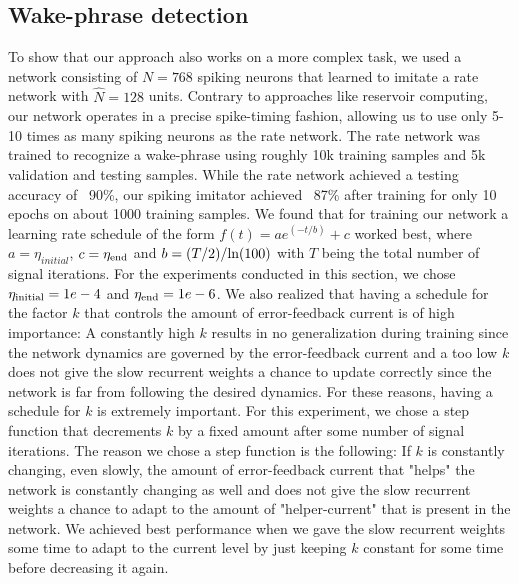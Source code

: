 \documentclass[twoside,11pt,titlepage]{article}
\begin{document}
\subsection{Wake-phrase detection}
To show that our approach also works on a more complex task, we used a network consisting of $N=768$ spiking
neurons that learned to imitate a rate network with $\hat{N}=128$ units. Contrary to approaches like
reservoir computing, our network operates in a precise spike-timing fashion, allowing us to use
only 5-10 times as many spiking neurons as the rate network. The rate network was trained to recognize
a wake-phrase using roughly 10k training samples and 5k validation and testing samples. While the rate network
achieved a testing accuracy of ~90\%, our spiking imitator achieved ~87\% after training for only 10 epochs on about 1000
training samples. We found that for training our network a learning rate schedule of the form $f(t)=a e^{(-t/b)}+c$
worked best, where $a=\eta_{initial}$, $c=\eta_\textnormal{end}$ and $b = (T/2) / \textnormal{ln}(100)$ with $T$ being the
total number of signal iterations. For the experiments conducted in this section, we chose $\eta_\textnormal{initial}=1e-4$ and $\eta_\textnormal{end}=1e-6$.
We also realized that having a schedule for the factor $k$ that controls the amount of error-feedback current is of high importance:
A constantly high $k$ results in no generalization during training since the network dynamics are governed by the error-feedback current and a too low
$k$ does not give the slow recurrent weights a chance to update correctly since the network is far from following the desired dynamics.
For these reasons, having a schedule for $k$ is extremely important. For this experiment, we chose a step function that decrements $k$ by a fixed amount
after some number of signal iterations. The reason we chose a step function is the following: 
If $k$ is constantly changing, even slowly, the amount of error-feedback current that "helps" the network
is constantly changing as well and does not give the slow recurrent weights a chance to adapt to the amount of "helper-current" that is
present in the network. We achieved best performance when we gave the slow recurrent weights some time to adapt to the current level by just
keeping $k$ constant for some time before decreasing it again.
\end{document}
